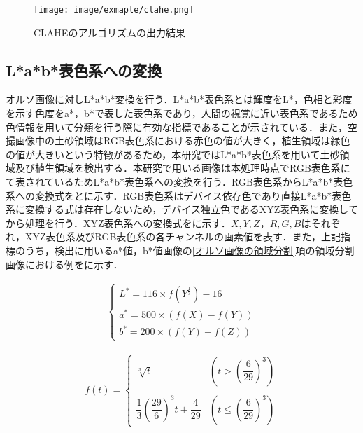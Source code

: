       \begin{figure}[t]
        \centering
        \texttt{[image: image/exmaple/clahe.png]}
        \caption{CLAHEのアルゴリズムの出力結果}
        \label{CLAHEのアルゴリズム結果}
      \end{figure}


    \subsection{L*a*b*表色系への変換}
      オルソ画像に対しL*a*b*変換\cite{Lab表色系1}を行う．L*a*b*表色系とは輝度をL*，色相と彩度を示す色度をa*，b*で表した表色系であり，人間の視覚に近い表色系であるため色情報を用いて分類を行う際に有効な指標であることが示されている．また，空撮画像中の土砂領域はRGB表色系における赤色の値が大きく，植生領域は緑色の値が大きいという特徴があるため，本研究ではL*a*b*表色系を用いて土砂領域及び植生領域を検出する\cite{Lab表色系2, Lab表色系3, Lab表色系4}．本研究で用いる画像は本処理時点でRGB表色系にて表されているためL*a*b*表色系への変換を行う．RGB表色系からL*a*b*表色系への変換式をとに示す．RGB表色系はデバイス依存色であり直接L*a*b*表色系に変換する式は存在しないため，デバイス独立色であるXYZ表色系\cite{XYZ表色系}に変換してから処理を行う．XYZ表色系への変換式をに示す．$X,Y,Z$，$R,G,B$はそれぞれ，XYZ表色系及びRGB表色系の各チャンネルの画素値を表す．また，上記指標のうち，検出に用いるa*値，b*値画像の\ref{オルソ画像の領域分割}項の領域分割画像における例をに示す．

      \begin{eqnarray}
      \label{Lab表色系1}
        \left\{
          \begin{array}{l}
            L^* = 116 \times f(Y^{\frac{1}{3}}) - 16 \\
            a^* = 500 \times (f(X) - f(Y)) \\
            b^* = 200 \times (f(Y) - f(Z))
          \end{array}
        \right.
      \end{eqnarray}

      \begin{eqnarray}
        \label{Lab表色系2}
          f(t) = 
          \left\{
            \begin{array}{lll}
              \sqrt[3]{t} 
                &(t >    (\dfrac{6} {29})^3) \\ \\
              \dfrac{1} {3} (\dfrac{29} {6})^3 t + \dfrac{4} {29}
                &(t \leq (\dfrac{6} {29})^3)
            \end{array}
          \right.
      \end{eqnarray}

